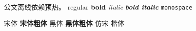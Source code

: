 \documentclass[a4paper,UTF8,zihao=-4,fontset=fandol]{ctexart}
\begin{document}
公文离线依赖预热。{\fontsize{16.06pt}{28pt}\selectfont
  regular \textbf{bold} \textit{italic} \textbf{\textit{bold italic}}
  \texttt{monospace}}

{\songti 宋体 \bfseries 宋体粗体}
{\heiti 黑体 \bfseries 黑体粗体}
{\fangsong 仿宋}
{\kaishu 楷体}
\end{document}
